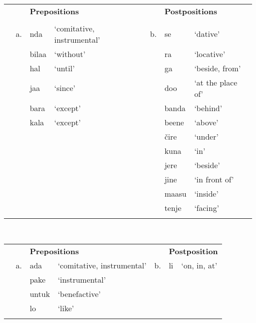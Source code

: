 \documentclass[output=paper]{langsci/langscibook}
\begin{document}
\begin{table}
\\
\begin{tabularx}{\textwidth}{XXXXXXX} &  & \multicolumn{2}{X}{\bfseries Prepositions} &  & \multicolumn{2}{X}{\bfseries Postpositions}\\
\lsptoprule
&  &  &  &  &  & \\
& a. & nda & ‘comitative, instrumental’ & b. & se & ‘dative’\\
&  & bilaa & ‘without’ &  & ra & ‘locative’\\
&  & hal & ‘until’ &  & ga & ‘beside, from’\\
&  & jaa & ‘since’ &  & doo & ‘at the place of’\\
&  & bara & ‘except’ &  & banda & ‘behind’\\
&  & kala & ‘except’ &  & beene & ‘above’\\
&  &  &  &  & čire & ‘under’\\
&  &  &  &  & kuna & ‘in’\\
&  &  &  &  & jere & ‘beside’\\
&  &  &  &  & jine & ‘in front of’\\
&  &  &  &  & maasu & ‘inside’\\
&  &  &  &  & tenje & ‘facing’\\
\lspbottomrule
\end{tabularx}
\end{table}

\begin{table}
\\
\begin{tabularx}{\textwidth}{XXXXXXX} &  & \multicolumn{2}{X}{\bfseries Prepositions} &  & \multicolumn{2}{X}{\bfseries Postposition}\\
\lsptoprule
& a. & ada & ‘comitative, instrumental’ & b. & li & ‘on, in, at’\footnotemark{}\\
&  & pake & ‘instrumental’ &  &  & \\
&  & untuk & ‘benefactive’ &  &  & \\
&  & lo & ‘like’ &  &  & \\
\lspbottomrule
\end{tabularx}
\end{table}
\end{document}
